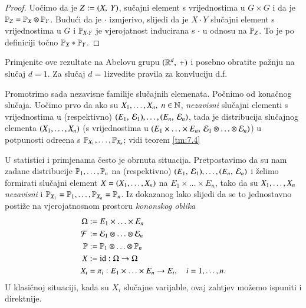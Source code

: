 \begin{proof}
    Uo\v cimo da je $Z:= ({X}, \: {Y})$, su\v cajni element s vrijednostima u $G \times G$ i da je $\mathbb{P}_Z = \mathbb{P}_X \otimes \mathbb{P}_Y$.
    Budu\' ci da je $\cdot$ izmjerivo, slijedi da je $X \cdot Y$ slu\v cajni element s vrijednostima u $G$ i $\mathbb{P}_{X \cdot Y}$ je vjerojatnost inducirana s $\cdot$ u odnosu na $\mathbb{P}_Z$.
    To je po definiciji to\v cno $\mathbb{P}_X * \mathbb{P}_Y$.
\end{proof}

\begin{zad} \label{zad:7.16}
    Primjenite ove rezultate na Abelovu grupu $({\mathbb{R}^d}, \: {+})$ i posebno obratite pa\v znju na slu\v caj $d = 1$.
    Za slu\v caj $d = 1$izvedite pravila za konvluciju d.f.
\end{zad}

Promotrimo sada nezavisne familije slu\v cajnih elemenata.
Po\v cnimo od kona\v cnog slu\v caja.
Uo\v cimo prvo da ako su ${X}_1, \ldots, {X}_n, \; n \in \mathbb{N}$, \emph{nezavisni} slu\v cajni elementi s vrijednostima u (respektivno) $({E_1}, \: {\mathcal{E}_1}), \ldots, ({E_n}, \: {\mathcal{E}_n})$, tada je distribucija slu\v cajnog elementa $({X}_1, \ldots, {X}_n)$ (s vrijednostima u $({E_1 \times \ldots \times E_n}, \: {\mathcal{E}_1 \otimes \ldots \otimes \mathcal{E}_n})$) u potpunosti odre\dj ena s $\mathbb{P}_{X_1}, \ldots, \mathbb{P}_{X_n}$; vidi teorem \ref{tm:7.4}

U statistici i primjenama \v cesto je obrnuta situacija.
Pretpostavimo da su nam zadane distribucije ${\mathbb{P}}_1, \ldots, {\mathbb{P}}_n$ na (respektivno) $({E_1}, \: {\mathcal{E}_1}), \ldots, ({E_n}, \: {\mathcal{E}_n})$ i \v zelimo formirati slu\v cajni element $X = ({X}_1, \ldots, {X}_n)$ na $E_1 \times \ldots \times E_n$, tako da su ${X}_1, \ldots, {X}_n$ \emph{nezavisni} i $\mathbb{P}_{X_1} = \mathbb{P}_1, \ldots, \mathbb{P}_{X_n} = \mathbb{P}_n$.
Iz dokazanog lako slijedi da se to jednostavno posti\v ze na vjerojatnosnom prostoru \emph{kononskog oblika}
\begin{equation} \label{jed:7.17}
    \begin{aligned}
        \Omega &:= E_1 \times \ldots \times E_n\\
        \mathcal{F} &:= \mathcal{E}_1 \otimes \ldots \otimes \mathcal{E}_n\\
        \mathbb{P} &:= \mathbb{P}_1 \otimes \ldots \otimes \mathbb{P}_n\\
        X &:= \mathrm{id} : \Omega \to \Omega\\
        X_i &= \pi_i : E_1 \times \ldots \times E_n \to E_i, \quad i = 1, \ldots, n.
    \end{aligned}
\end{equation}
U klasi\v cnoj situaciji, kada su $X_i$ slu\v cajne varijable, ovaj zahtjev mo\v zemo ispuniti i direktnije.

